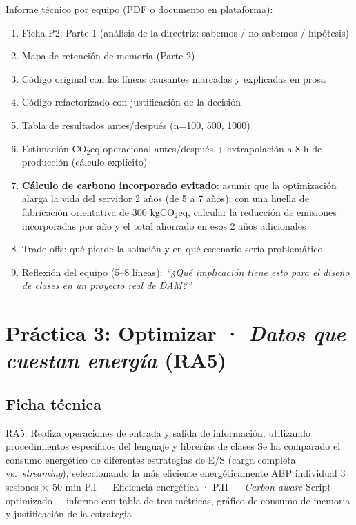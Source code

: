 Informe técnico por equipo (PDF o documento en plataforma):

\begin{enumerate}
\item Ficha P2: Parte 1 (análisis de la directriz: sabemos / no sabemos / hipótesis)
\item Mapa de retención de memoria (Parte 2)
\item Código original con las líneas causantes marcadas y explicadas en prosa
\item Código refactorizado con justificación de la decisión
\item Tabla de resultados antes/después (n=100, 500, 1000)
\item Estimación CO$_2$eq operacional antes/después + extrapolación a 8 h de producción (cálculo explícito)
\item \textbf{Cálculo de carbono incorporado evitado}: asumir que la optimización alarga la vida del servidor 2 años (de 5 a 7 años); con una huella de fabricación orientativa de 300 kgCO$_2$eq, calcular la reducción de emisiones incorporadas por año y el total ahorrado en esos 2 años adicionales
\item Trade-offs: qué pierde la solución y en qué escenario sería problemático
\item Reflexión del equipo (5–8 líneas): \textit{``¿Qué implicación tiene esto para el diseño de clases en un proyecto real de DAM?''}
\end{enumerate}




\section{Práctica 3: Optimizar · \textit{Datos que cuestan energía} (RA5)}


\subsection{Ficha técnica}


  {RA5: Realiza operaciones de entrada y salida de información, utilizando procedimientos específicos del lenguaje y librerías de clases}
  {Se ha comparado el consumo energético de diferentes estrategias de E/S (carga completa vs.\ \textit{streaming}), seleccionando la más eficiente energéticamente}
  {ABP individual}
  {3 sesiones $\times$ 50 min}
  {P.I — Eficiencia energética · P.II — \textit{Carbon-aware}}
  {Script optimizado + informe con tabla de tres métricas, gráfico de consumo de memoria y justificación de la estrategia}


